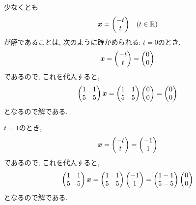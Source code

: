 \begin{checkanswer}%
  少なくとも
  \begin{align*}
    \boldsymbol{x}=\begin{pmatrix}-t\\t\end{pmatrix} && (t\in\mathbb{R})
  \end{align*}
  が解であることは, 次のように確かめられる:
  $t=0$のとき,
  \begin{align*}
    \boldsymbol{x}=\begin{pmatrix}-t\\t\end{pmatrix}=\begin{pmatrix}0\\0\end{pmatrix}
  \end{align*}
  であるので, これを代入すると,
  \begin{align*}
    \begin{pmatrix}1&1\\5&5\end{pmatrix}\boldsymbol{x}
     =
    \begin{pmatrix}1&1\\5&5\end{pmatrix}\begin{pmatrix}0\\0\end{pmatrix}
     =
    \begin{pmatrix}0\\0\end{pmatrix}
  \end{align*}
  となるので解である.

  $t=1$のとき,
  \begin{align*}
    \boldsymbol{x}=\begin{pmatrix}-t\\t\end{pmatrix}=\begin{pmatrix}-1\\1\end{pmatrix}
  \end{align*}
  であるので, これを代入すると,
  \begin{align*}
    \begin{pmatrix}1&1\\5&5\end{pmatrix}\boldsymbol{x}
     =
    \begin{pmatrix}1&1\\5&5\end{pmatrix}\begin{pmatrix}-1\\1\end{pmatrix}
     =
    \begin{pmatrix}1-1\\5-5\end{pmatrix}
    \begin{pmatrix}0\\0\end{pmatrix}
  \end{align*}
  となるので解である.
\end{checkanswer}
